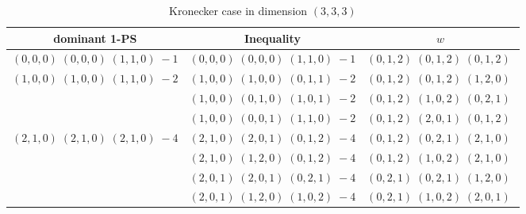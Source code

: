 \documentclass[11pt]{article}
\begin{document}
 
 \begin{longtable}[l]{|c|c|c|} 
 \caption{Kronecker case in dimension $(3,3,3)$} \\  
 
 \hline 
 \textrm{dominant 1-PS} & \textrm{Inequality} & $w$ \\ 
 \hline\multirow[t]{1}{*}{ $(0 ,0 ,0) \;(0 ,0 ,0) \;(1 ,1 ,0) \;-1$ }  & $(0 ,0 ,0) \;(0 ,0 ,0) \;(1 ,1 ,0) \;-1$ & $(0 ,1 ,2) \;(0 ,1 ,2) \;(0 ,1 ,2) \;$\\ \hline\multirow[t]{3}{*}{ $(1 ,0 ,0) \;(1 ,0 ,0) \;(1 ,1 ,0) \;-2$ }  & $(1 ,0 ,0) \;(1 ,0 ,0) \;(0 ,1 ,1) \;-2$ & $(0 ,1 ,2) \;(0 ,1 ,2) \;(1 ,2 ,0) \;$\\ 
 \cline{2-3} 
 & $(1 ,0 ,0) \;(0 ,1 ,0) \;(1 ,0 ,1) \;-2$ & $(0 ,1 ,2) \;(1 ,0 ,2) \;(0 ,2 ,1) \;$\\ 
 \cline{2-3} 
 & $(1 ,0 ,0) \;(0 ,0 ,1) \;(1 ,1 ,0) \;-2$ & $(0 ,1 ,2) \;(2 ,0 ,1) \;(0 ,1 ,2) \;$\\ \hline\multirow[t]{4}{*}{ $(2 ,1 ,0) \;(2 ,1 ,0) \;(2 ,1 ,0) \;-4$ }  & $(2 ,1 ,0) \;(2 ,0 ,1) \;(0 ,1 ,2) \;-4$ & $(0 ,1 ,2) \;(0 ,2 ,1) \;(2 ,1 ,0) \;$\\ 
 \cline{2-3} 
 & $(2 ,1 ,0) \;(1 ,2 ,0) \;(0 ,1 ,2) \;-4$ & $(0 ,1 ,2) \;(1 ,0 ,2) \;(2 ,1 ,0) \;$\\ 
 \cline{2-3} 
 & $(2 ,0 ,1) \;(2 ,0 ,1) \;(0 ,2 ,1) \;-4$ & $(0 ,2 ,1) \;(0 ,2 ,1) \;(1 ,2 ,0) \;$\\ 
 \cline{2-3} 
 & $(2 ,0 ,1) \;(1 ,2 ,0) \;(1 ,0 ,2) \;-4$ & $(0 ,2 ,1) \;(1 ,0 ,2) \;(2 ,0 ,1) \;$\\ \hline
  
 \end{longtable} 
 
\end{document}
